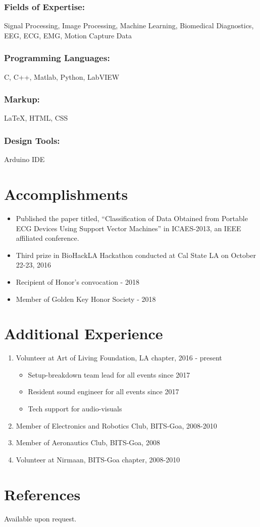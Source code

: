 \documentclass{article}
\begin{document}
\subsubsection{Fields of Expertise:} 
Signal Processing, Image Processing, Machine Learning, Biomedical Diagnostics, EEG, ECG, EMG, Motion Capture Data
\subsubsection{Programming Languages:} 
C, C++, Matlab, Python, LabVIEW
\subsubsection{Markup:} 
{\LaTeX}, HTML, CSS
\subsubsection{Design Tools:} 
Arduino IDE


\section{Accomplishments}
\begin{itemize}
    \item Published the paper titled, “Classification of Data Obtained from Portable ECG Devices Using Support Vector Machines” in ICAES-2013, an IEEE affiliated conference.
    \item Third prize in BioHackLA Hackathon conducted at Cal State LA on October 22-23, 2016
    \item Recipient of Honor's convocation - 2018
    \item Member of Golden Key Honor Society - 2018
\end{itemize}

\section{Additional Experience}
\begin{enumerate}
    \item Volunteer at Art of Living Foundation, LA chapter, 2016 - present
    \begin{itemize}
        \item Setup-breakdown team lead for all events since 2017
        \item Resident sound engineer for all events since 2017
        \item Tech support for audio-visuals
    \end{itemize}
    \item Member of Electronics and Robotics Club, BITS-Goa, 2008-2010
    \item Member of Aeronautics Club, BITS-Goa, 2008
    \item Volunteer at Nirmaan, BITS-Goa chapter, 2008-2010
\end{enumerate}


\section{References}
Available upon request.
\end{document}
